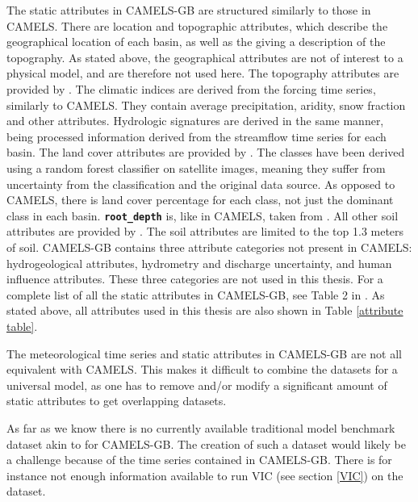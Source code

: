 The static attributes in CAMELS-GB are structured similarly to those in CAMELS. 
There are location and topographic attributes, which describe the geographical 
location of each basin, as well as the giving a description of the topography. 
As stated above, the geographical attributes are not of interest to a physical model, 
and are therefore not used here. The topography attributes are provided by 
\citet{morris1990digital}.
The climatic indices are derived from the forcing time series, similarly to CAMELS. 
They contain average precipitation, aridity, snow fraction and other attributes.
Hydrologic signatures are derived in the same manner, being processed information 
derived from the streamflow time series for each basin. 
The land cover attributes are provided by \citet{rowland2017land}. The classes 
have been derived using a random forest classifier on satellite images, meaning 
they suffer from uncertainty from the classification and the original data source. 
As opposed to CAMELS, there is land cover percentage for each class, not just the 
dominant class in each basin.
\textbf{\texttt{root\_depth}} is, like in CAMELS, taken from \citet{pelletier}. 
All other soil attributes are provided by \citet{hiederer2013mappinga, hiederer2013mappingb}.
The soil attributes are limited to the top 1.3 meters of soil. CAMELS-GB 
contains three attribute categories not present in CAMELS: hydrogeological attributes, 
hydrometry and discharge uncertainty, and human influence attributes. These three 
categories are not used in this thesis. For a complete list of all the static 
attributes in CAMELS-GB, see Table 2 in \citet{CAMELS_GB}. As stated above, all 
attributes used in this thesis are also shown in Table \ref{attribute table}.

The meteorological time series and static attributes in CAMELS-GB are 
not all equivalent with CAMELS. This makes it difficult to combine the datasets
for a universal model, as one has to remove and/or modify a significant amount of 
static attributes to get overlapping datasets.
 
As far as we know there is no currently available traditional model benchmark dataset 
akin to \cite{CAMELS_hydroshare} for CAMELS-GB. The creation of such a dataset would 
likely be a challenge because of the time series contained in CAMELS-GB. There is for 
instance not enough information available to run VIC (see section \ref{VIC}) on 
the dataset.
